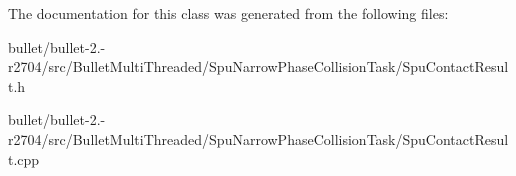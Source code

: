 The documentation for this class was generated from the following files\+:\begin{DoxyCompactItemize}
\item 
bullet/bullet-\/2.-\/r2704/src/\+Bullet\+Multi\+Threaded/\+Spu\+Narrow\+Phase\+Collision\+Task/Spu\+Contact\+Result.\+h\item 
bullet/bullet-\/2.-\/r2704/src/\+Bullet\+Multi\+Threaded/\+Spu\+Narrow\+Phase\+Collision\+Task/Spu\+Contact\+Result.\+cpp\end{DoxyCompactItemize}
